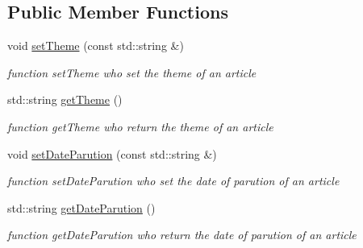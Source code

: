 \subsection*{Public Member Functions}
\begin{DoxyCompactItemize}
\item 
\hypertarget{classArticle_a58990f0362ae7e950e1a1d4f4b9f9453}{
void \hyperlink{classArticle_a58990f0362ae7e950e1a1d4f4b9f9453}{setTheme} (const std::string \&)}
\label{classArticle_a58990f0362ae7e950e1a1d4f4b9f9453}

\begin{DoxyCompactList}\small\item\em function setTheme who set the theme of an article \item\end{DoxyCompactList}\item 
\hypertarget{classArticle_a2d927194ffdd4c66021adb5fabe0da40}{
std::string \hyperlink{classArticle_a2d927194ffdd4c66021adb5fabe0da40}{getTheme} ()}
\label{classArticle_a2d927194ffdd4c66021adb5fabe0da40}

\begin{DoxyCompactList}\small\item\em function getTheme who return the theme of an article \item\end{DoxyCompactList}\item 
\hypertarget{classArticle_a00ee1ebbaf5e559732933dd29f0a9360}{
void \hyperlink{classArticle_a00ee1ebbaf5e559732933dd29f0a9360}{setDateParution} (const std::string \&)}
\label{classArticle_a00ee1ebbaf5e559732933dd29f0a9360}

\begin{DoxyCompactList}\small\item\em function setDateParution who set the date of parution of an article \item\end{DoxyCompactList}\item 
\hypertarget{classArticle_a0c97939e7c98396fbe68bd32509470bf}{
std::string \hyperlink{classArticle_a0c97939e7c98396fbe68bd32509470bf}{getDateParution} ()}
\label{classArticle_a0c97939e7c98396fbe68bd32509470bf}

\begin{DoxyCompactList}\small\item\em function getDateParution who return the date of parution of an article \item\end{DoxyCompactList}\end{DoxyCompactItemize}
